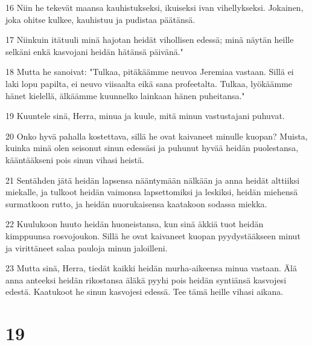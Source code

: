 \par 16 Niin he tekevät maansa kauhistukseksi, ikuiseksi ivan vihellykseksi. Jokainen, joka ohitse kulkee, kauhistuu ja pudistaa päätänsä.
\par 17 Niinkuin itätuuli minä hajotan heidät vihollisen edessä; minä näytän heille selkäni enkä kasvojani heidän hätänsä päivänä."
\par 18 Mutta he sanoivat: "Tulkaa, pitäkäämme neuvoa Jeremiaa vastaan. Sillä ei laki lopu papilta, ei neuvo viisaalta eikä sana profeetalta. Tulkaa, lyökäämme hänet kielellä, älkäämme kuunnelko lainkaan hänen puheitansa."
\par 19 Kuuntele sinä, Herra, minua ja kuule, mitä minun vastustajani puhuvat.
\par 20 Onko hyvä pahalla kostettava, sillä he ovat kaivaneet minulle kuopan? Muista, kuinka minä olen seisonut sinun edessäsi ja puhunut hyvää heidän puolestansa, kääntääkseni pois sinun vihasi heistä.
\par 21 Sentähden jätä heidän lapsensa nääntymään nälkään ja anna heidät alttiiksi miekalle, ja tulkoot heidän vaimonsa lapsettomiksi ja leskiksi, heidän miehensä surmatkoon rutto, ja heidän nuorukaisensa kaatakoon sodassa miekka.
\par 22 Kuulukoon huuto heidän huoneistansa, kun sinä äkkiä tuot heidän kimppuunsa rosvojoukon. Sillä he ovat kaivaneet kuopan pyydystääkseen minut ja virittäneet salaa pauloja minun jaloilleni.
\par 23 Mutta sinä, Herra, tiedät kaikki heidän murha-aikeensa minua vastaan. Älä anna anteeksi heidän rikostansa äläkä pyyhi pois heidän syntiänsä kasvojesi edestä. Kaatukoot he sinun kasvojesi edessä. Tee tämä heille vihasi aikana.

\chapter{19}

